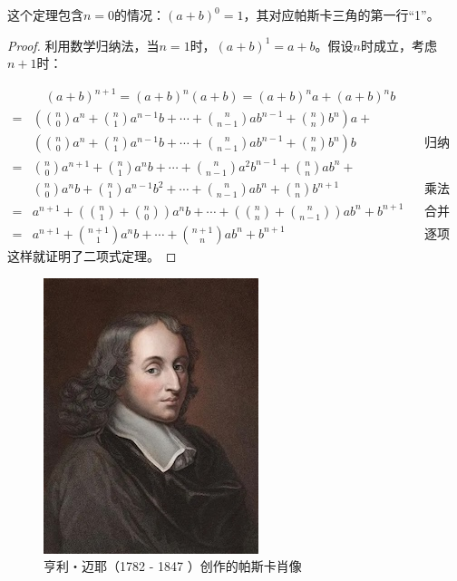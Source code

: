 \documentclass[b5paper]{ctexart}
\begin{document}
这个定理包含$n=0$的情况：$(a+b)^0 = 1$，其对应帕斯卡三角的第一行“1”。

\begin{proof}
利用数学归纳法，当$n = 1$时，$(a + b)^1 = a + b$。假设$n$时成立，考虑$n + 1$时：

\begin{align*}
 &\quad (a + b)^{n+1} = (a+b)^n(a + b) = (a + b)^n a + (a + b)^n b \\
= & (\binom{n}{0}a^n + \binom{n}{1}a^{n-1}b + \dotsb + \binom{n}{n-1}ab^{n-1} + \binom{n}{n}b^n)a + \\
 &(\binom{n}{0}a^n + \binom{n}{1}a^{n-1}b + \dotsb + \binom{n}{n-1}ab^{n-1} + \binom{n}{n}b^n)b &&\text{归纳假设} \\
= & \binom{n}{0}a^{n+1} + \binom{n}{1}a^nb + \dotsb + \binom{n}{n-1}a^2b^{n-1} + \binom{n}{n}ab^n + \\
 & \binom{n}{0}a^nb + \binom{n}{1}a^{n-1}b^2 + \dotsb + \binom{n}{n-1}ab^n + \binom{n}{n}b^{n+1} &&\text{乘法分配律} \\
= & a^{n+1} + (\binom{n}{1} + \binom{n}{0})a^nb + \dotsb + (\binom{n}{n} + \binom{n}{n-1})ab^n + b^{n+1} &&\text{合并同类项} \\
= & a^{n+1} + \binom{n+1}{1}a^nb + \dotsb + \binom{n+1}{n}ab^n + b^{n+1} && \text{逐项用帕斯卡法则}
\end{align*}
这样就证明了二项式定理。
\end{proof}

\begin{figure}[htbp]
  \centering
  \includegraphics[scale=0.5]{img/Pascal}
  \caption{亨利・迈耶（1782 - 1847 ）创作的帕斯卡肖像}
 \label{fig:Pascal}
\end{figure}
\end{document}

